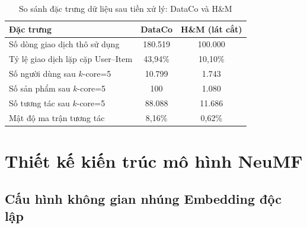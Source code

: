 \begin{table}[htbp]
    \centering
    \caption{So sánh đặc trưng dữ liệu sau tiền xử lý: DataCo và H\&M}
    \label{tab:dataco_vs_hm}
    \begin{tabular}{|l|c|c|}
        \hline
        \textbf{Đặc trưng} & \textbf{DataCo} & \textbf{H\&M (lát cắt)} \\
        \hline
        Số dòng giao dịch thô sử dụng & 180.519 & 100.000 \\
        \hline
        Tỷ lệ giao dịch lặp cặp User--Item & 43,94\% & 10,10\% \\
        \hline
        Số người dùng sau $k$-core=5 & 10.799 & 1.743 \\
        \hline
        Số sản phẩm sau $k$-core=5 & 100 & 1.080 \\
        \hline
        Số tương tác sau $k$-core=5 & 88.088 & 11.686 \\
        \hline
        Mật độ ma trận tương tác & 8,16\% & 0,62\% \\
        \hline
    \end{tabular}
\end{table}

\section{Thiết kế kiến trúc mô hình NeuMF}
\label{sec:model_design}

\subsection{Cấu hình không gian nhúng Embedding độc lập}
\label{subsec:embedding_design}

